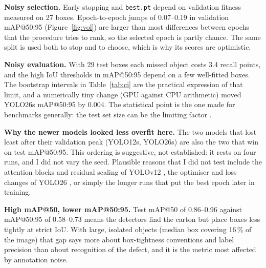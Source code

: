 \documentclass[11pt,a4paper]{article}
\begin{document}
\textbf{Noisy selection.} Early stopping and \texttt{best.pt} depend on validation fitness measured on 27 boxes. Epoch-to-epoch jumps of 0.07--0.19 in validation mAP@50:95 (Figure~\ref{fig:vol}) are larger than most differences between epochs that the procedure tries to rank, so the selected epoch is partly chance. The same split is used both to stop and to choose, which is why its scores are optimistic.

\textbf{Noisy evaluation.} With 29 test boxes each missed object costs 3.4 recall points, and the high IoU thresholds in mAP@50:95 depend on a few well-fitted boxes. The bootstrap intervals in Table~\ref{tab:ci} are the practical expression of that limit, and a numerically tiny change (GPU against CPU arithmetic) moved YOLO26s mAP@50:95 by 0.004. The statistical point is the one made for benchmarks generally: the test set size can be the limiting factor \cite{bouthillier2021variance}.

\textbf{Why the newer models looked less overfit here.} The two models that lost least after their validation peak (YOLO12s, YOLO26s) are also the two that win on test mAP@50:95. This ordering is suggestive, not established: it rests on four runs, and I did not vary the seed. Plausible reasons that I did not test include the attention blocks and residual scaling of YOLOv12 \cite{tian2025yolov12}, the optimiser and loss changes of YOLO26 \cite{ultralytics_yolo26_vs_11}, or simply the longer runs that put the best epoch later in training.

\textbf{High mAP@50, lower mAP@50:95.} Test mAP@50 of 0.86--0.96 against mAP@50:95 of 0.58--0.73 means the detectors find the carton but place boxes less tightly at strict IoU. With large, isolated objects (median box covering 16\,\% of the image) that gap says more about box-tightness conventions and label precision than about recognition of the defect, and it is the metric most affected by annotation noise.
\end{document}
